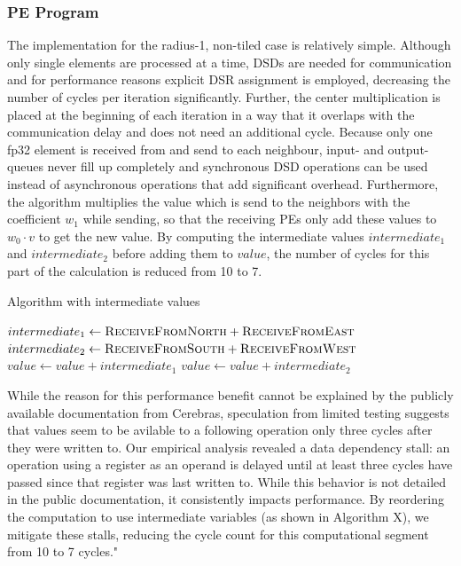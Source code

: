 \documentclass{article}
\begin{document}
\subsubsection{PE Program}
The implementation for the radius-1, non-tiled case is relatively simple.
Although only single elements are processed at a time, DSDs are needed for communication and for performance reasons explicit DSR assignment is employed, decreasing the number of cycles per iteration significantly.  
Further, the center multiplication is placed at the beginning of each iteration in a way that it overlaps with the communication delay and does not need an additional cycle.
Because only one fp32 element is received from and send to each neighbour, input- and output- queues never fill up completely and synchronous DSD operations can be used instead of asynchronous operations that add significant overhead.
Furthermore, the algorithm multiplies the value which is send to the neighbors with the coefficient $w_1$ while sending, so that the receiving PEs only add these values to $w_0 \cdot v$ to get the new value.
By computing the intermediate values $intermediate_1$ and $intermediate_2$ before adding them to $value$, the number of cycles for this part of the calculation is reduced from 10 to 7.
\begin{algorithm}
    \caption{Algorithm with intermediate values}
    \begin{algorithmic}[1]
        \State $intermediate_1 \gets \Call{ReceiveFromNorth}{} + \Call{ReceiveFromEast}{}$
        \State $intermediate_2 \gets \Call{ReceiveFromSouth}{} + \Call{ReceiveFromWest}{}$
        \State $value \gets value +intermediate_1$
        \State $value \gets value +intermediate_2$
    \end{algorithmic}
\end{algorithm}
While the reason for this performance benefit cannot be explained by the publicly available documentation from Cerebras, speculation from limited testing suggests that values seem to be avilable to a following operation only three cycles after they were written to.
Our empirical analysis revealed a data dependency stall: an operation using a register as an operand is delayed until at least three cycles have passed since that register was last written to. While this behavior is not detailed in the public documentation, it consistently impacts performance. By reordering the computation to use intermediate variables (as shown in Algorithm X), we mitigate these stalls, reducing the cycle count for this computational segment from 10 to 7 cycles."
\end{document}
